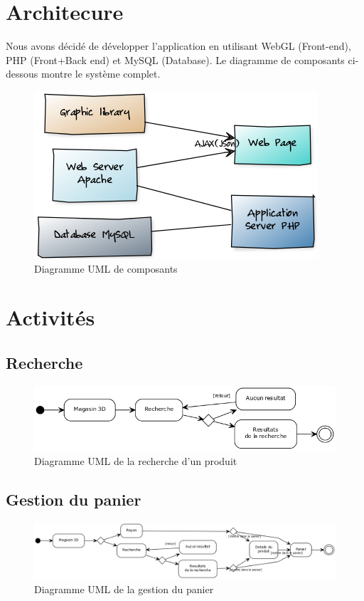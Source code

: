 \documentclass[12pt]{article}
\begin{document}
\section{Architecure}
Nous avons décidé de développer l'application en utilisant WebGL (Front-end), PHP (Front+Back end) et MySQL (Database).
Le diagramme de composants ci-dessous montre le système complet.
\begin{figure}[ht]
    \center
    \includegraphics[scale=0.6]{../Diagrams/ComposantDiagrams/composants.png}
    \caption*{Diagramme UML de composants}
\end{figure}

\newpage
\section{Activités}

\subsection{Recherche}

\begin{figure}[ht]
    \center
    \includegraphics[scale=0.6]{../Diagrams/ActivityDiagrams/recherche.png}
    \caption*{Diagramme UML de la recherche d'un produit}
\end{figure}

\subsection{Gestion du panier}

\begin{figure}[ht]
    \center
    \includegraphics[scale=0.4]{../Diagrams/ActivityDiagrams/panier.png}
    \caption*{Diagramme UML de la gestion du panier}
\end{figure}
\end{document}
